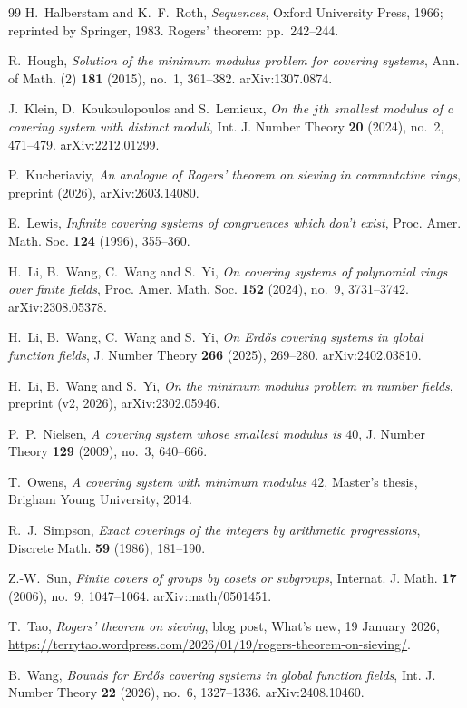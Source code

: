 \begin{thebibliography}{99}
H.~Halberstam and K.~F.~Roth,
\emph{Sequences}, Oxford University Press, 1966; reprinted by Springer, 1983. Rogers' theorem: pp.~242--244.

R.~Hough,
\emph{Solution of the minimum modulus problem for covering systems},
Ann. of Math. (2) \textbf{181} (2015), no.~1, 361--382. arXiv:1307.0874.

J.~Klein, D.~Koukoulopoulos and S.~Lemieux,
\emph{On the $j$th smallest modulus of a covering system with distinct moduli},
Int. J. Number Theory \textbf{20} (2024), no.~2, 471--479. arXiv:2212.01299.

P.~Kucheriaviy,
\emph{An analogue of {R}ogers' theorem on sieving in commutative rings}, preprint (2026), arXiv:2603.14080.

E.~Lewis,
\emph{Infinite covering systems of congruences which don't exist},
Proc. Amer. Math. Soc. \textbf{124} (1996), 355--360.

H.~Li, B.~Wang, C.~Wang and S.~Yi,
\emph{On covering systems of polynomial rings over finite fields},
Proc. Amer. Math. Soc. \textbf{152} (2024), no.~9, 3731--3742. arXiv:2308.05378.

H.~Li, B.~Wang, C.~Wang and S.~Yi,
\emph{On {E}rd\H{o}s covering systems in global function fields},
J. Number Theory \textbf{266} (2025), 269--280. arXiv:2402.03810.

H.~Li, B.~Wang and S.~Yi,
\emph{On the minimum modulus problem in number fields}, preprint (v2, 2026), arXiv:2302.05946.

P.~P.~Nielsen,
\emph{A covering system whose smallest modulus is $40$},
J. Number Theory \textbf{129} (2009), no.~3, 640--666.

T.~Owens,
\emph{A covering system with minimum modulus $42$}, Master's thesis, Brigham Young University, 2014.

R.~J.~Simpson,
\emph{Exact coverings of the integers by arithmetic progressions},
Discrete Math. \textbf{59} (1986), 181--190.

Z.-W.~Sun,
\emph{Finite covers of groups by cosets or subgroups},
Internat. J. Math. \textbf{17} (2006), no.~9, 1047--1064. arXiv:math/0501451.

T.~Tao,
\emph{Rogers' theorem on sieving}, blog post, What's new, 19 January 2026,
\url{https://terrytao.wordpress.com/2026/01/19/rogers-theorem-on-sieving/}.

B.~Wang,
\emph{Bounds for {E}rd\H{o}s covering systems in global function fields},
Int. J. Number Theory \textbf{22} (2026), no.~6, 1327--1336. arXiv:2408.10460.

\end{thebibliography}
